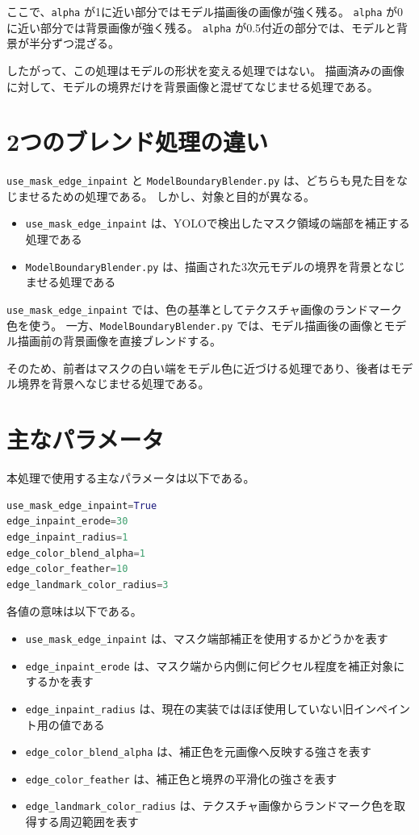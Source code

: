 \documentclass[uplatex,dvipdfmx]{jsarticle}
\begin{document}
ここで、\texttt{alpha} が1に近い部分ではモデル描画後の画像が強く残る。
\texttt{alpha} が0に近い部分では背景画像が強く残る。
\texttt{alpha} が0.5付近の部分では、モデルと背景が半分ずつ混ざる。

したがって、この処理はモデルの形状を変える処理ではない。
描画済みの画像に対して、モデルの境界だけを背景画像と混ぜてなじませる処理である。

\section{2つのブレンド処理の違い}

\texttt{use\_mask\_edge\_inpaint} と \texttt{ModelBoundaryBlender.py} は、どちらも見た目をなじませるための処理である。
しかし、対象と目的が異なる。

\begin{itemize}
  \item \texttt{use\_mask\_edge\_inpaint} は、YOLOで検出したマスク領域の端部を補正する処理である
  \item \texttt{ModelBoundaryBlender.py} は、描画された3次元モデルの境界を背景となじませる処理である
\end{itemize}

\texttt{use\_mask\_edge\_inpaint} では、色の基準としてテクスチャ画像のランドマーク色を使う。
一方、\texttt{ModelBoundaryBlender.py} では、モデル描画後の画像とモデル描画前の背景画像を直接ブレンドする。

そのため、前者はマスクの白い端をモデル色に近づける処理であり、後者はモデル境界を背景へなじませる処理である。

\section{主なパラメータ}

本処理で使用する主なパラメータは以下である。

\begin{lstlisting}[language=Python]
use_mask_edge_inpaint=True
edge_inpaint_erode=30
edge_inpaint_radius=1
edge_color_blend_alpha=1
edge_color_feather=10
edge_landmark_color_radius=3
\end{lstlisting}

各値の意味は以下である。

\begin{itemize}
  \item \texttt{use\_mask\_edge\_inpaint} は、マスク端部補正を使用するかどうかを表す
  \item \texttt{edge\_inpaint\_erode} は、マスク端から内側に何ピクセル程度を補正対象にするかを表す
  \item \texttt{edge\_inpaint\_radius} は、現在の実装ではほぼ使用していない旧インペイント用の値である
  \item \texttt{edge\_color\_blend\_alpha} は、補正色を元画像へ反映する強さを表す
  \item \texttt{edge\_color\_feather} は、補正色と境界の平滑化の強さを表す
  \item \texttt{edge\_landmark\_color\_radius} は、テクスチャ画像からランドマーク色を取得する周辺範囲を表す
\end{itemize}
\end{document}
